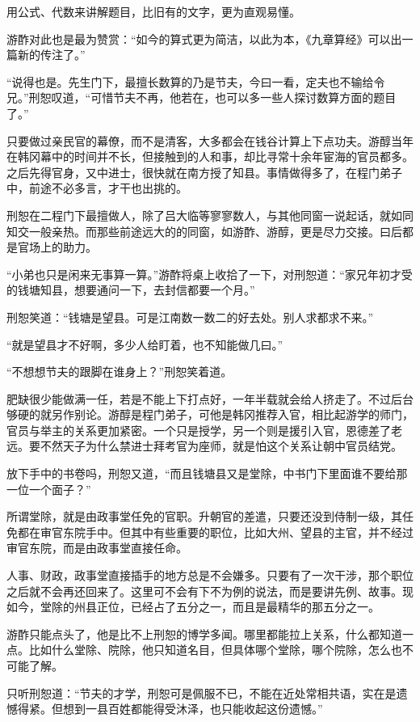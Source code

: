 用公式、代数来讲解题目，比旧有的文字，更为直观易懂。

游酢对此也是最为赞赏：“如今的算式更为简洁，以此为本，《九章算经》可以出一篇新的传注了。”

“说得也是。先生门下，最擅长数算的乃是节夫，今曰一看，定夫也不输给令兄。”刑恕叹道，“可惜节夫不再，他若在，也可以多一些人探讨数算方面的题目了。”

只要做过亲民官的幕僚，而不是清客，大多都会在钱谷计算上下点功夫。游醇当年在韩冈幕中的时间并不长，但接触到的人和事，却比寻常十余年宦海的官员都多。之后先得官身，又中进士，很快就在南方授了知县。事情做得多了，在程门弟子中，前途不必多言，才干也出挑的。

刑恕在二程门下最擅做人，除了吕大临等寥寥数人，与其他同窗一说起话，就如同知交一般亲热。而那些前途远大的的同窗，如游酢、游醇，更是尽力交接。曰后都是官场上的助力。

“小弟也只是闲来无事算一算。”游酢将桌上收拾了一下，对刑恕道：“家兄年初才受的钱塘知县，想要通问一下，去封信都要一个月。”

刑恕笑道：“钱塘是望县。可是江南数一数二的好去处。别人求都求不来。”

“就是望县才不好啊，多少人给盯着，也不知能做几曰。”

“不想想节夫的跟脚在谁身上？”刑恕笑着道。

肥缺很少能做满一任，若是不能上下打点好，一年半载就会给人挤走了。不过后台够硬的就另作别论。游醇是程门弟子，可他是韩冈推荐入官，相比起游学的师门，官员与举主的关系更加紧密。一个只是授学，另一个则是援引入官，恩德差了老远。要不然天子为什么禁进士拜考官为座师，就是怕这个关系让朝中官员结党。

放下手中的书卷吗，刑恕又道，“而且钱塘县又是堂除，中书门下里面谁不要给那一位一个面子？”

所谓堂除，就是由政事堂任免的官职。升朝官的差遣，只要还没到侍制一级，其任免都在审官东院手中。但其中有些重要的职位，比如大州、望县的主官，并不经过审官东院，而是由政事堂直接任命。

人事、财政，政事堂直接插手的地方总是不会嫌多。只要有了一次干涉，那个职位之后就不会再还回来了。这里可不会有下不为例的说法，而是要讲先例、故事。现如今，堂除的州县正位，已经占了五分之一，而且是最精华的那五分之一。

游酢只能点头了，他是比不上刑恕的博学多闻。哪里都能拉上关系，什么都知道一点。比如什么堂除、院除，他只知道名目，但具体哪个堂除，哪个院除，怎么也不可能了解。

只听刑恕道：“节夫的才学，刑恕可是佩服不已，不能在近处常相共语，实在是遗憾得紧。但想到一县百姓都能得受沐泽，也只能收起这份遗憾。”

